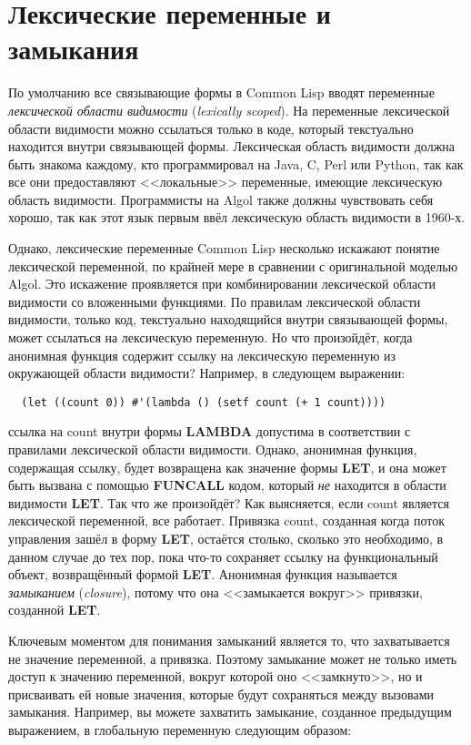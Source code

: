 \section{Лексические переменные и замыкания}

По умолчанию все связывающие формы в Common Lisp вводят переменные \textit{лексической
  области видимости} (\textit{lexically scoped}). На переменные лексической области
видимости можно ссылаться только в коде, который текстуально находится внутри связывающей
формы. Лексическая область видимости должна быть знакома каждому, кто программировал на
Java, C, Perl или Python, так как все они предоставляют <<локальные>> переменные, имеющие
лексическую область видимости. Программисты на Algol также должны чувствовать себя хорошо,
так как этот язык первым ввёл лексическую область видимости в 1960-х.

Однако, лексические переменные Common Lisp несколько искажают понятие лексической
переменной, по крайней мере в сравнении с оригинальной моделью Algol. Это искажение
проявляется при комбинировании лексической области видимости со вложенными функциями. По
правилам лексической области видимости, только код, текстуально находящийся внутри
связывающей формы, может ссылаться на лексическую переменную. Но что произойдёт, когда
анонимная функция содержит ссылку на лексическую переменную из окружающей области
видимости? Например, в следующем выражении:

\begin{lstlisting}
  (let ((count 0)) #'(lambda () (setf count (+ 1 count))))
\end{lstlisting}

ссылка на count внутри формы \textbf{LAMBDA} допустима в соответствии с правилами
лексической области видимости. Однако, анонимная функция, содержащая ссылку, будет
возвращена как значение формы \textbf{LET}, и она может быть вызвана с помощью
\textbf{FUNCALL} кодом, который \textit{не} находится в области видимости
\textbf{LET}. Так что же произойдёт? Как выясняется, если count является лексической
переменной, все работает. Привязка count, созданная когда поток управления зашёл в форму
\textbf{LET}, остаётся столько, сколько это необходимо, в данном случае до тех пор, пока
что-то сохраняет ссылку на функциональный объект, возвращённый формой
\textbf{LET}. Анонимная функция называется \textit{замыканием} (\textit{closure}), потому
что она <<замыкается вокруг>> привязки, созданной \textbf{LET}.

Ключевым моментом для понимания замыканий является то, что захватывается не значение
переменной, а привязка. Поэтому замыкание может не только иметь доступ к значению
переменной, вокруг которой оно <<замкнуто>>, но и присваивать ей новые значения, которые
будут сохраняться между вызовами замыкания. Например, вы можете захватить замыкание,
созданное предыдущим выражением, в глобальную переменную следующим образом:

